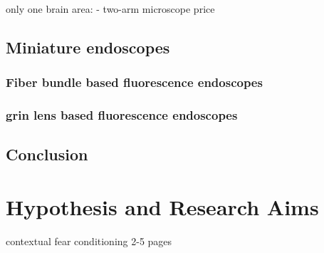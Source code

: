 only one brain area:
    - two-arm microscope
price 

\subsection{Miniature endoscopes}
\subsubsection{Fiber bundle based fluorescence endoscopes}
\subsubsection{\gls{grin} lens based fluorescence endoscopes}
\subsection{Conclusion}


\section{Hypothesis and Research Aims}
\citep{rozeske14} contextual fear conditioning
2-5 pages

